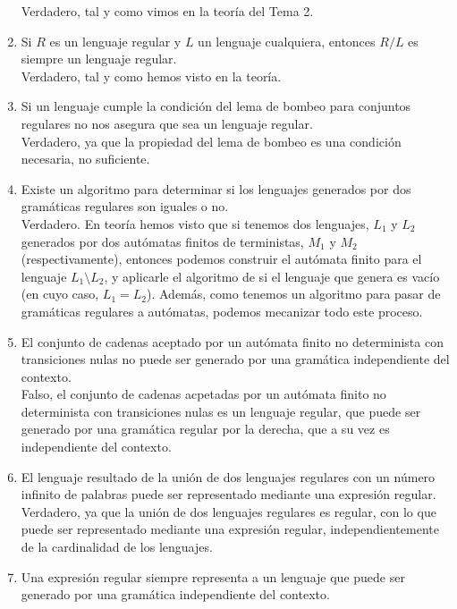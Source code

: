 \begin{enumerate}
        Verdadero, tal y como vimos en la teoría del Tema 2.
    \item Si $R$ es un lenguaje regular y $L$ un lenguaje cualquiera, entonces $R/L$ es siempre un lenguaje regular.\\

        Verdadero, tal y como hemos visto en la teoría.
    \item Si un lenguaje cumple la condición del lema de bombeo para conjuntos regulares no nos asegura que sea un lenguaje regular.\\

        Verdadero, ya que la propiedad del lema de bombeo es una condición necesaria, no suficiente.
    \item Existe un algoritmo para determinar si los lenguajes generados por dos gramáticas regulares son iguales o no.\\

        Verdadero. En teoría hemos visto que si tenemos dos lenguajes, $L_1$ y $L_2$ generados por dos autómatas finitos de terministas, $M_1$ y $M_2$ (respectivamente), entonces podemos construir el autómata finito para el lenguaje $L_1\setminus L_2$, y aplicarle el algoritmo de si el lenguaje que genera es vacío (en cuyo caso, $L_1=L_2$). Además, como tenemos un algoritmo para pasar de gramáticas regulares a autómatas, podemos mecanizar todo este proceso.
    \item El conjunto de cadenas aceptado por un autómata finito no determinista con transiciones nulas no puede ser generado por una gramática independiente del contexto.\\

        Falso, el conjunto de cadenas acpetadas por un autómata finito no determinista con transiciones nulas es un lenguaje regular, que puede ser generado por una gramática regular por la derecha, que a su vez es independiente del contexto.
    \item El lenguaje resultado de la unión de dos lenguajes regulares con un número infinito de palabras puede ser representado mediante una expresión regular.\\

        Verdadero, ya que la unión de dos lenguajes regulares es regular, con lo que puede ser representado mediante una expresión regular, independientemente de la cardinalidad de los lenguajes.
    \item Una expresión regular siempre representa a un lenguaje que puede ser generado por una gramática independiente del contexto.\\


\end{enumerate}
